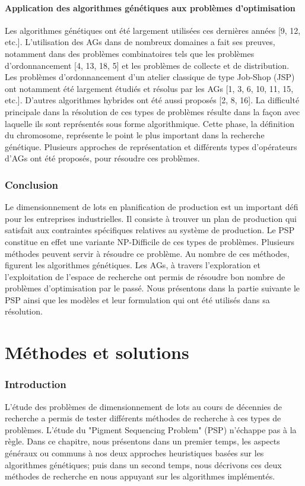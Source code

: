 \documentclass[12pt,a4paper]{article}
\begin{document}
	\subsection{Application des algorithmes génétiques aux problèmes d'optimisation}
	
	Les algorithmes génétiques ont été largement utilisées ces dernières années [9, 12, etc.]. L’utilisation des AGs dans de nombreux domaines a fait ses preuves, notamment dans des problèmes combinatoires tels que les problèmes d’ordonnancement [4, 13, 18, 5] et les problèmes de collecte et de distribution. Les problèmes d’ordonnancement d’un atelier classique de type Job-Shop (JSP) ont notamment été largement étudiés et résolus par les AGs [1, 3, 6, 10, 11, 15, etc.]. D’autres algorithmes hybrides ont été aussi proposés [2, 8, 16]. La difficulté principale dans la résolution de ces types de problèmes résulte dans la façon avec laquelle ils sont représentés sous forme algorithmique. Cette phase, la définition du chromosome, représente le point le plus important dans la recherche génétique. Plusieurs approches de représentation
et différents types d’opérateurs d’AGs ont été proposés, pour résoudre ces problèmes.
	
	\section*{Conclusion}
	Le dimensionnement de lots en planification de production est un important défi pour les entreprises industrielles. Il consiste à trouver un plan de production qui satisfait aux contraintes spécifiques relatives au système de production. Le PSP constitue en effet une variante NP-Difficile de ces types de problèmes. Plusieurs méthodes peuvent servir à résoudre ce problème. Au nombre de ces méthodes, figurent les algorithmes génétiques. Les AGs, à travers l'exploration et l'exploitation de l'espace de recherche ont permis de résoudre bon nombre de problèmes d'optimisation par le passé. Nous présentons dans la partie suivante le PSP ainsi que les modèles et leur formulation qui ont été utilisés dans sa résolution.		
		
	\newpage
	
	\part{Méthodes et solutions}
	\setcounter{section}{0}
	
	\section*{Introduction}
	L'étude des problèmes de dimensionnement de lots au cours de décennies de recherche a permis de tester différents méthodes de recherche à ces types de problèmes. L'étude du "Pigment Sequencing Problem" (PSP) n'échappe pas à la règle. Dans ce chapitre, nous présentons dans un premier temps, les aspects généraux ou communs à nos deux approches heuristiques basées sur les algorithmes génétiques; puis dans un second temps, nous décrivons ces deux méthodes de recherche en nous appuyant sur les algorithmes implémentés.
	
\end{document}
